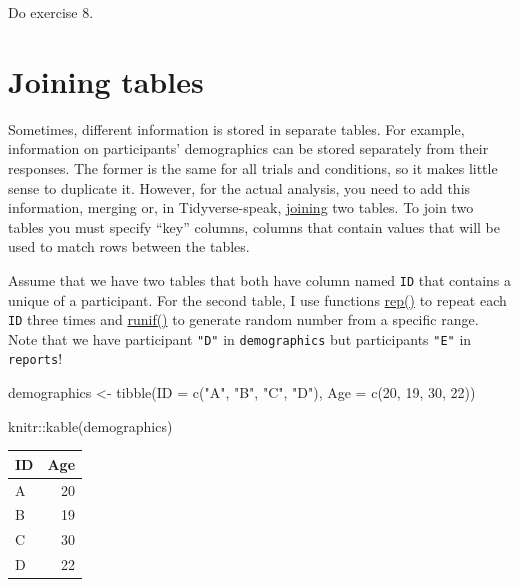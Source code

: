 \documentclass[
]{book}
\newenvironment{Shaded}{\begin{snugshade}}{\end{snugshade}}
\newcommand{\AttributeTok}[1]{\textcolor[rgb]{0.77,0.63,0.00}{#1}}
\newcommand{\DecValTok}[1]{\textcolor[rgb]{0.00,0.00,0.81}{#1}}
\newcommand{\FunctionTok}[1]{\textcolor[rgb]{0.00,0.00,0.00}{#1}}
\newcommand{\NormalTok}[1]{#1}
\newcommand{\OtherTok}[1]{\textcolor[rgb]{0.56,0.35,0.01}{#1}}
\newcommand{\SpecialCharTok}[1]{\textcolor[rgb]{0.00,0.00,0.00}{#1}}
\newcommand{\StringTok}[1]{\textcolor[rgb]{0.31,0.60,0.02}{#1}}
\begin{document}
Do exercise 8.

\hypertarget{joining-tables}{%
\section{Joining tables}\label{joining-tables}}

Sometimes, different information is stored in separate tables. For example, information on participants' demographics can be stored separately from their responses. The former is the same for all trials and conditions, so it makes little sense to duplicate it. However, for the actual analysis, you need to add this information, merging or, in Tidyverse-speak, \href{https://dplyr.tidyverse.org/reference/mutate-joins.html}{joining} two tables. To join two tables you must specify ``key'' columns, columns that contain values that will be used to match rows between the tables.

Assume that we have two tables that both have column named \texttt{ID} that contains a unique of a participant. For the second table, I use functions \href{https://stat.ethz.ch/R-manual/R-devel/library/base/html/rep.html}{rep()} to repeat each \texttt{ID} three times and \href{https://stat.ethz.ch/R-manual/R-devel/library/stats/html/Uniform.html}{runif()} to generate random number from a specific range. Note that we have participant \texttt{"D"} in \texttt{demographics} but participants \texttt{"E"} in \texttt{reports}!

\begin{Shaded}
\begin{Highlighting}[]
\NormalTok{demographics }\OtherTok{\textless{}{-}} \FunctionTok{tibble}\NormalTok{(}\AttributeTok{ID =} \FunctionTok{c}\NormalTok{(}\StringTok{"A"}\NormalTok{, }\StringTok{"B"}\NormalTok{, }\StringTok{"C"}\NormalTok{, }\StringTok{"D"}\NormalTok{),}
                       \AttributeTok{Age =} \FunctionTok{c}\NormalTok{(}\DecValTok{20}\NormalTok{, }\DecValTok{19}\NormalTok{, }\DecValTok{30}\NormalTok{, }\DecValTok{22}\NormalTok{))}

\NormalTok{knitr}\SpecialCharTok{::}\FunctionTok{kable}\NormalTok{(demographics)}
\end{Highlighting}
\end{Shaded}

\begin{tabular}{l|r}
\hline
ID & Age\\
\hline
A & 20\\
\hline
B & 19\\
\hline
C & 30\\
\hline
D & 22\\
\hline
\end{tabular}
\end{document}
